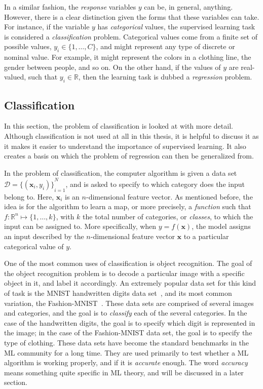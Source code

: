 In a similar fashion, the \emph{response} variables $y$ can be, in general, anything. 
However, there is a clear distinction given the forms that these variables can take. For 
instance, if the variable $y$ has \emph{categorical} values, the supervised learning task 
is considered a \emph{classification} problem. Categorical values come from a finite set of 
possible values, \(y_{i} \in \{1, \dots, C\}\), and might represent any type of discrete or 
nominal value. For example, it might represent the colors in a clothing line, the gender 
between people, and so on. On the other hand, if the values of $y$ are real-valued, such 
that \(y_{i} \in \mathbb{R}\), then the learning task is dubbed a \emph{regression} problem.

\subsection{Classification}
In this section, the problem of classification is looked at with more detail. Although 
classification is not used at all in this thesis, it is helpful to discuss it as it makes
it easier to understand the importance of supervised learning. It also creates a basis on 
which the problem of regression can then be generalized from.

In the problem of classification, the computer algorithm is given a data set \(\mathcal
{D}={ \{(\mathbf{x}_{i}, y_i)\} }_{i=1}^{N}\), and is asked to specify to which category 
does the input belong to. Here, $\mathbf{x}_i$ is an $n$-dimensional feature vector. As 
mentioned before, the idea is for the algorithm to learn a map, or more precisely, a \emph
{function} such that $f \colon \mathbb{R}^n \mapsto \{1, \dots, k\}$, with $k$ the total 
number of categories, or \emph{classes}, to which the input can be assigned to. More 
specifically, when $y=f(\mathbf{x})$, the model assigns an input described by the 
$n$-dimensional feature vector $\mathbf{x}$ to a particular categorical value of $y$.

One of the most common uses of classification is object recognition. The goal of the object 
recognition problem is to decode a particular image with a specific object in it, and label 
it accordingly. An extremely popular data set for this kind of task is the MNIST 
handwritten digits data set~\cite{lecunGradientbasedLearningApplied1998a}, and its most 
common variation, the Fashion-MNIST~\cite{xiaoFashionMNISTNovelImage2017a}. 
These data sets are 
comprised of several images and categories, and the goal is to \emph{classify} each of the 
several categories. In the case of the handwritten digits, the goal is to specify which 
digit is represented in the image; in the case of the Fashion-MNIST data set, the goal is 
to specify the type of clothing. These data sets have become the standard benchmarks 
in the ML community for a long time. They are used primarily to test whether a ML 
algorithm is working properly, and if it is \emph{accurate} enough. The word 
\emph{accuracy} means something quite specific in ML theory, and will be discussed in a 
later section.

